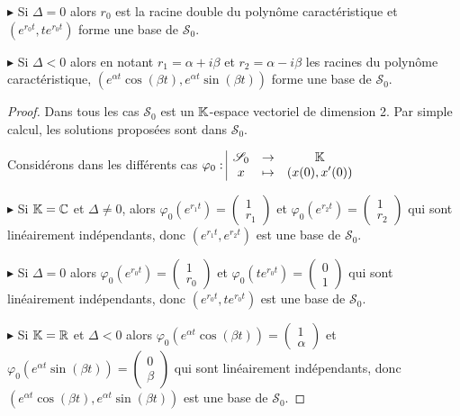 $\blacktriangleright$ Si $\Delta = 0$ alors $r_0$ est la racine double du polynôme caractéristique et $(e^{r_0 t}, te^{r_0 t})$ forme une base de $\mathscr S_0$.

$\blacktriangleright$ Si $\Delta < 0$ alors en notant $r_1 = \alpha + i \beta$ et $r_2 = \alpha - i \beta$ les racines du polynôme caractéristique, $(e^{\alpha t} \cos (\beta t), e^{\alpha t} \sin (\beta t))$ forme une base de $\mathscr S_0$.


\begin{proof}
    Dans tous les cas $\mathscr S_0$ est un $\mathbb{K}$-espace vectoriel de dimension 2. 
    Par simple calcul, les solutions proposées sont dans $\mathscr S_0$. 

    Considérons dans les différents cas $\varphi_0: \space \begin{array}{|ccc} \displaystyle \mathscr S_0 & \to & \displaystyle \mathbb{K} \\ \displaystyle x & \mapsto & \displaystyle (x(0), x'(0)) \end{array}$ 
    
    $\blacktriangleright$ Si $\mathbb{K} = \mathbb{C}$ et $\Delta \neq 0$, alors $\varphi_0(e^{r_1 t}) = \begin{pmatrix}
        1 \\ r_1
    \end{pmatrix}$ et $\varphi_0(e^{r_2 t}) = \begin{pmatrix}
        1 \\ r_2
    \end{pmatrix}$ qui sont linéairement indépendants, donc $(e^{r_1 t}, e^{r_2 t})$ est une base de $\mathscr S_0$.

    \avspace $\blacktriangleright$ Si $\Delta = 0$ alors $\varphi_0(e^{r_0 t}) = \begin{pmatrix}
        1 \\ r_0
    \end{pmatrix}$ et $\varphi_0(te^{r_0 t}) = \begin{pmatrix}
        0 \\ 1
    \end{pmatrix}$ qui sont linéairement indépendants, donc $(e^{r_0 t}, te^{r_0 t})$ est une base de $\mathscr S_0$.

    \avspace $\blacktriangleright$ Si $\mathbb{K} = \mathbb{R}$ et $\Delta < 0$ alors $\varphi_0(e^{\alpha t} \cos (\beta t)) = \begin{pmatrix}
        1 \\ \alpha
    \end{pmatrix}$ et $\varphi_0(e^{\alpha t} \sin (\beta t)) = \begin{pmatrix}
        0 \\ \beta
    \end{pmatrix}$ qui sont linéairement indépendants, donc $(e^{\alpha t} \cos (\beta t), e^{\alpha t} \sin (\beta t))$ est une base de $\mathscr S_0$.
\end{proof}

